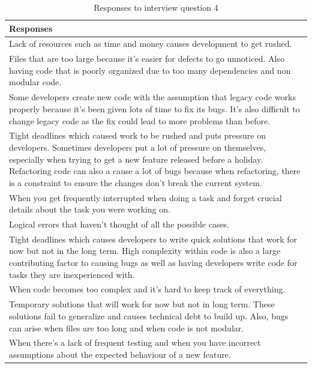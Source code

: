 \documentclass[../main.tex]{subfiles}
\begin{document}
\begin{table}[H]
\centering
\caption{Responses to interview question 4}
    \begin{tabular}{|p{15cm}|}
        \hline
        \textbf{Responses}\\ 
        \hline\hline
        Lack of resources such as time and money causes development to get rushed.\\
        \hline
        Files that are too large because it's easier for defects to go unnoticed. Also having code that is poorly organized due to too many dependencies and non modular code.\\
        \hline
        Some developers create new code with the assumption that legacy code works properly because it's been given lots of time to fix its bugs. It's also difficult to change legacy code as the fix could lead to more problems than before.\\
        \hline
        Tight deadlines which caused work to be rushed and puts pressure on developers. Sometimes developers put a lot of pressure on themselves, especially when trying to get a new feature released before a holiday. Refactoring code can also a cause a lot of bugs because when refactoring, there is a constraint to ensure the changes don't break the current system.\\
        \hline
        When you get frequently interrupted when doing a task and forget crucial details about the task you were working on.\\
        \hline
        Logical errors that haven't thought of all the possible cases.\\
        \hline
        Tight deadlines which causes developers to write quick solutions that work for now but not in the long term. High complexity within code is also a large contributing factor to causing bugs as well as having developers write code for tasks they are inexperienced with.\\
        \hline
        When code becomes too complex and it's hard to keep track of everything.\\
        \hline
        Temporary solutions that will work for now but not in long term. These solutions fail to generalize and causes technical debt to build up. Also, bugs can arise when files are too long and when code is not modular.\\
        \hline
        When there's a lack of frequent testing and when you have incorrect assumptions about the expected behaviour of a new feature.\\
        \hline
    \end{tabular}
\label{table:rq4Table4}
\end{table}
\end{document}
